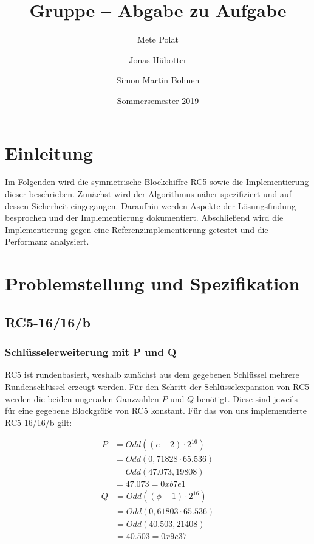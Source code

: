 \documentclass[course=erap]{aspdoc}
\author{Mete Polat \and Jonas Hübotter \and Simon Martin Bohnen}
\date{Sommersemester 2019} %
\title{Gruppe \theGroup{} -- Abgabe zu Aufgabe \theNumber}
\begin{document}
\maketitle

\section{Einleitung}

Im Folgenden wird die symmetrische Blockchiffre RC5 sowie die Implementierung dieser beschrieben. Zunächst wird der Algorithmus näher spezifiziert und auf dessen Sicherheit eingegangen. Daraufhin werden Aspekte der Lösungsfindung besprochen und der Implementierung dokumentiert. Abschließend wird die Implementierung gegen eine Referenzimplementierung getestet und die Performanz analysiert.

\section{Problemstellung und Spezifikation}

\subsection{RC5-16/16/b}

\subsubsection{Schlüsselerweiterung mit P und Q}

RC5 ist rundenbasiert, weshalb zunächst aus dem gegebenen Schlüssel mehrere Rundenschlüssel erzeugt werden. Für den Schritt der Schlüsselexpansion von RC5 werden die beiden ungeraden Ganzzahlen $P$ und $Q$ benötigt. Diese sind jeweils für eine gegebene Blockgröße von RC5 konstant. Für das von uns implementierte RC5-16/16/b gilt:

\begin{multicols}{2}
\noindent
\begin{align*}
P &= Odd((e - 2) \cdot 2^{16}) \\
  &= Odd(0,71828 \cdot 65.536) \\
  &= Odd(47.073,19808) \\
  &= 47.073 = 0xb7e1
\end{align*}
\begin{align*}
Q &= Odd((\phi - 1) \cdot 2^{16}) \\
  &= Odd(0,61803 \cdot 65.536) \\
  &= Odd(40.503,21408) \\
  &= 40.503 = 0x9e37
\end{align*}
\end{multicols}
\end{document}
